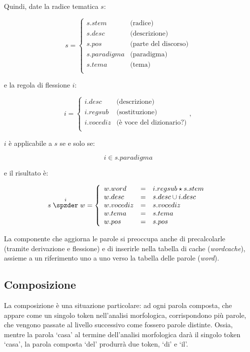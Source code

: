 \documentclass[twoside,stylearticle,11pt,filologia,it,article,bibsection]{spinoza}
\newcommand\spzmunify{\cup}
\newcommand\spzmregsub{\star}
\newenvironment{lingmeq}{\begin{lingeq}\[}{\]\end{lingeq}}
\begin{document}
Quindi, date la radice tematica $s$:
\begin{lingmeq}
s=\left\{\begin{array}{lr}
s.{stem} & \text{(radice)}\\
s.desc & \text{(descrizione)}\\
s.{pos} & \text{(parte del discorso)}\\
s.paradigma & \text{(paradigma)}\\
s.tema & \text{(tema)}\\
\end{array}\right.
\end{lingmeq}
\noindent e la regola di flessione $i$:
\begin{lingmeq}
i=\left\{\begin{array}{lr}
i.desc & \text{(descrizione)}\\
i.{regsub} & \text{(sostituzione)}\\
i.vocediz & \text{(è voce del dizionario?)}\\
\end{array}\right.,
\end{lingmeq}
\noindent $i$ è applicabile a $s$ se e solo se:
\begin{lingmeq}
i \in s.paradigma
\end{lingmeq}
\noindent e il risultato è:
\begin{lingmeq}
s \stackrel{i}{\spzder} w = \left\{
\begin{array}{lll}
w.word &=& i.regsub \spzmregsub s.stem\\
w.desc &=& s.desc \spzmunify i.desc \\
w.vocediz &=& s.vocediz \\
w.tema &=& s.tema \\
w.pos &=& s.pos \\
\end{array}
\right.
\end{lingmeq}

La componente che aggiorna le parole si preoccupa anche di
precalcolarle (tramite derivazione e flessione) e di inserirle nella
tabella di cache ({\it wordcache}), assieme a un riferimento uno a uno
verso la tabella delle parole ({\it word}).

\subsection{Composizione}

\label{sec:composizione}

La composizione è una situazione particolare: ad ogni parola composta,
che appare come un singolo token nell'analisi morfologica,
corrispondono più parole, che vengono passate al livello successivo
come fossero parole distinte. Ossia, mentre la parola `casa' al
termine dell'analisi morfologica darà il singolo token `casa', la
parola composta `del' produrrà due token, `di' e `il'.
\end{document}
